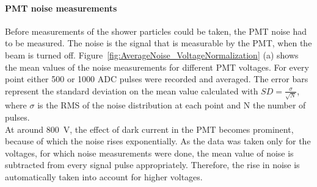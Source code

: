 \paragraph{PMT noise measurements}
Before measurements of the shower particles could be taken, the PMT noise had to be measured.
The noise is the signal that is measurable by the PMT, when the beam is turned off.
Figure~\ref{fig:AverageNoise_VoltageNormalization} (a) shows the mean values of the noise measurements for different PMT voltages. 
For every point either 500 or 1000 ADC pulses were recorded and averaged.
The error bars represent the standard deviation on the mean value calculated with \mbox{$SD=\frac{\sigma}{\sqrt{N}}$}, where $\sigma$ is the RMS of the noise distribution at each point and N the number of pulses.\\
At around \SI{800}{\volt}, the effect of dark current  in the PMT becomes prominent, because of which the noise rises exponentially. 
As the data was taken only for the voltages, for which noise measurements were done, the mean value of noise is subtracted from every signal pulse appropriately. 
Therefore, the rise in noise is automatically taken into account for higher voltages.
